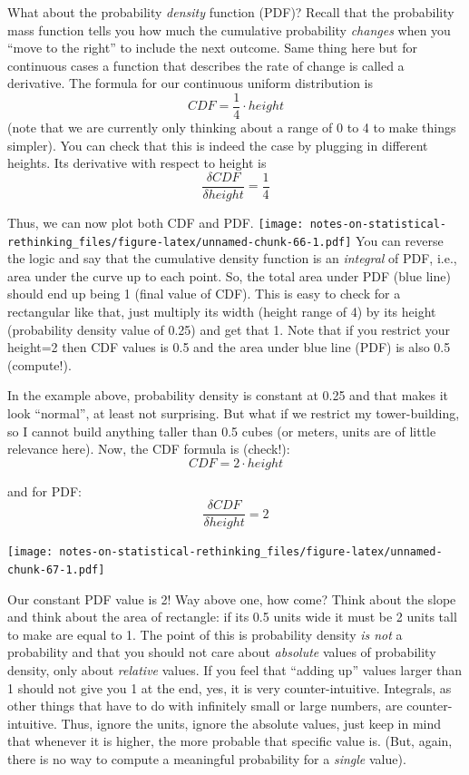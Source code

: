 \documentclass[
]{book}
\begin{document}
What about the probability \emph{density} function (PDF)? Recall that the probability mass function tells you how much the cumulative probability \emph{changes} when you ``move to the right'' to include the next outcome. Same thing here but for continuous cases a function that describes the rate of change is called a derivative. The formula for our continuous uniform distribution is
\[CDF = \frac{1}{4} \cdot height\]
(note that we are currently only thinking about a range of 0 to 4 to make things simpler). You can check that this is indeed the case by plugging in different heights. Its derivative with respect to height is
\[\frac{\delta CDF}{\delta height} = \frac{1}{4}\]

Thus, we can now plot both CDF and PDF.
\texttt{[image: notes-on-statistical-rethinking\_files/figure-latex/unnamed-chunk-66-1.pdf]}
You can reverse the logic and say that the cumulative density function is an \emph{integral} of PDF, i.e., area under the curve up to each point. So, the total area under PDF (blue line) should end up being 1 (final value of CDF). This is easy to check for a rectangular like that, just multiply its width (height range of 4) by its height (probability density value of 0.25) and get that 1. Note that if you restrict your height=2 then CDF values is 0.5 and the area under blue line (PDF) is also 0.5 (compute!).

In the example above, probability density is constant at 0.25 and that makes it look ``normal'', at least not surprising. But what if we restrict my tower-building, so I cannot build anything taller than 0.5 cubes (or meters, units are of little relevance here). Now, the CDF formula is (check!):
\[CDF = 2 \cdot height\]

and for PDF:
\[\frac{\delta CDF}{\delta height} = 2\]

\texttt{[image: notes-on-statistical-rethinking\_files/figure-latex/unnamed-chunk-67-1.pdf]}

Our constant PDF value is 2! Way above one, how come? Think about the slope and think about the area of rectangle: if its 0.5 units wide it must be 2 units tall to make are equal to 1. The point of this is probability density \emph{is not} a probability and that you should not care about \emph{absolute} values of probability density, only about \emph{relative} values. If you feel that ``adding up'' values larger than 1 should not give you 1 at the end, yes, it is very counter-intuitive. Integrals, as other things that have to do with infinitely small or large numbers, are counter-intuitive. Thus, ignore the units, ignore the absolute values, just keep in mind that whenever it is higher, the more probable that specific value is. (But, again, there is no way to compute a meaningful probability for a \emph{single} value).
\end{document}
